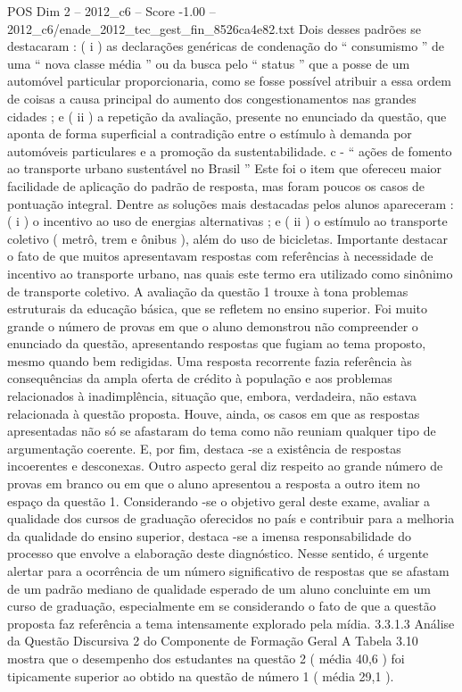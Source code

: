\begin{textsample}{POS Dim 2 – 2012\_c6 – Score -1.00 – 2012\_c6/enade\_2012\_tec\_gest\_fin\_8526ca4e82.txt}
Dois desses padrões se destacaram : ( i ) as declarações genéricas de condenação do “ consumismo ” de uma “ nova classe média ” ou da busca pelo “ status ” que a posse de um automóvel particular proporcionaria, como se fosse possível atribuir a essa ordem de coisas a causa principal do aumento dos congestionamentos nas grandes cidades ; e ( ii ) a repetição da avaliação, presente no enunciado da questão, que aponta de forma superficial a contradição entre o estímulo à demanda por automóveis particulares e a promoção da sustentabilidade. c - “ ações de fomento ao transporte urbano sustentável no Brasil ” Este foi o item que ofereceu maior facilidade de aplicação do padrão de resposta, mas foram poucos os casos de pontuação integral.
Dentre as soluções mais destacadas pelos alunos apareceram : ( i ) o incentivo ao uso de energias alternativas ; e ( ii ) o estímulo ao transporte coletivo ( metrô, trem e ônibus ), além do uso de bicicletas.
Importante destacar o fato de que muitos apresentavam respostas com referências à necessidade de incentivo ao transporte urbano, nas quais este termo era utilizado como sinônimo de transporte coletivo.
A avaliação da questão 1 trouxe à tona problemas estruturais da educação básica, que se refletem no ensino superior.
Foi muito grande o número de provas em que o aluno demonstrou não compreender o enunciado da questão, apresentando respostas que fugiam ao tema proposto, mesmo quando bem redigidas.
Uma resposta recorrente fazia referência às consequências da ampla oferta de crédito à população e aos problemas relacionados à inadimplência, situação que, embora, verdadeira, não estava relacionada à questão proposta.
Houve, ainda, os casos em que as respostas apresentadas não só se afastaram do tema como não reuniam qualquer tipo de argumentação coerente.
E, por fim, destaca -se a existência de respostas incoerentes e desconexas.
Outro aspecto geral diz respeito ao grande número de provas em branco ou em que o aluno apresentou a resposta a outro item no espaço da questão 1.
Considerando -se o objetivo geral deste exame, avaliar a qualidade dos cursos de graduação oferecidos no país e contribuir para a melhoria da qualidade do ensino superior, destaca -se a imensa responsabilidade do processo que envolve a elaboração deste diagnóstico.
Nesse sentido, é urgente alertar para a ocorrência de um número significativo de respostas que se afastam de um padrão mediano de qualidade esperado de um aluno concluinte em um curso de graduação, especialmente em se considerando o fato de que a questão proposta faz referência a tema intensamente explorado pela mídia. 3.3.1.3 Análise da Questão Discursiva 2 do Componente de Formação Geral A Tabela 3.10 mostra que o desempenho dos estudantes na questão 2 ( média 40,6 ) foi tipicamente superior ao obtido na questão de número 1 ( média 29,1 ).

\end{textsample}
